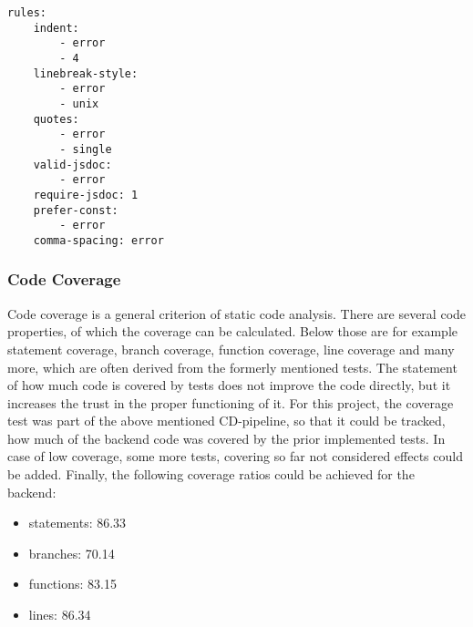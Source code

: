 \begin{lstlisting}[caption={Extract from the rules of the \textit{Lint} configuration file.}, label=lst:lintrules]
rules:
	indent:
		- error
		- 4
	linebreak-style:
		- error
		- unix
	quotes:
		- error
		- single
	valid-jsdoc:
		- error
	require-jsdoc: 1
	prefer-const:
		- error
	comma-spacing: error
\end{lstlisting}

\subsubsection{Code Coverage}
\label{subsubsec:codecoverage}
Code coverage is a general criterion of static code analysis. There are several code properties, of which the coverage can be calculated. Below those are for example statement coverage, branch coverage, function coverage, line coverage and many more, which are often derived from the formerly mentioned tests. The statement of how much code is covered by tests does not improve the code directly, but it increases the trust in the proper functioning of it. 
\newline\newline
For this project, the coverage test was part of the above mentioned CD-pipeline, so that it could be tracked, how much of the backend code was covered by the prior implemented tests. In case of low coverage, some more tests, covering so far not considered effects could be added. Finally, the following coverage ratios could be achieved for the backend:
\begin{itemize}
	\item statements: 86.33%
	\item branches: 70.14%
	\item functions: 83.15%
	\item lines: 86.34%
\end{itemize} 

